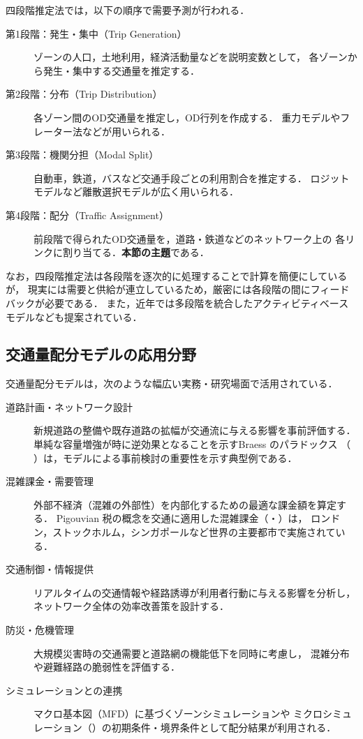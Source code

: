 四段階推定法では，以下の順序で需要予測が行われる．

\begin{description}
  \item[第1段階：発生・集中（Trip Generation）]
    ゾーンの人口，土地利用，経済活動量などを説明変数として，
    各ゾーンから発生・集中する交通量を推定する．
  \item[第2段階：分布（Trip Distribution）]
    各ゾーン間のOD交通量を推定し，OD行列を作成する．
    重力モデルやフレーター法などが用いられる．
  \item[第3段階：機関分担（Modal Split）]
    自動車，鉄道，バスなど交通手段ごとの利用割合を推定する．
    ロジットモデルなど離散選択モデルが広く用いられる．
  \item[第4段階：配分（Traffic Assignment）]
    前段階で得られたOD交通量を，道路・鉄道などのネットワーク上の
    各リンクに割り当てる．\textbf{本節の主題}である．
\end{description}

なお，四段階推定法は各段階を逐次的に処理することで計算を簡便にしているが，
現実には需要と供給が連立しているため，厳密には各段階の間にフィードバックが必要である．
また，近年では多段階を統合したアクティビティベースモデルなども提案されている\cite{Sheffi1985}．

\subsection*{交通量配分モデルの応用分野}

交通量配分モデルは，次のような幅広い実務・研究場面で活用されている．

\begin{description}
  \item[道路計画・ネットワーク設計]
    新規道路の整備や既存道路の拡幅が交通流に与える影響を事前評価する．
    単純な容量増強が時に逆効果となることを示すBraess のパラドックス
    （ ）は，モデルによる事前検討の重要性を示す典型例である\cite{Braess1968}．
  \item[混雑課金・需要管理]
    外部不経済（混雑の外部性）を内部化するための最適な課金額を算定する．
    Pigouvian 税の概念を交通に適用した混雑課金（・）は，
    ロンドン，ストックホルム，シンガポールなど世界の主要都市で実施されている\cite{Pigou1920,Vickrey1969}．
  \item[交通制御・情報提供]
    リアルタイムの交通情報や経路誘導が利用者行動に与える影響を分析し，
    ネットワーク全体の効率改善策を設計する．
  \item[防災・危機管理]
    大規模災害時の交通需要と道路網の機能低下を同時に考慮し，
    混雑分布や避難経路の脆弱性を評価する．
  \item[シミュレーションとの連携]
    マクロ基本図（MFD）に基づくゾーンシミュレーションや
    ミクロシミュレーション（）の初期条件・境界条件として配分結果が利用される\cite{Daganzo2007,Geroliminis2008}．
\end{description}


